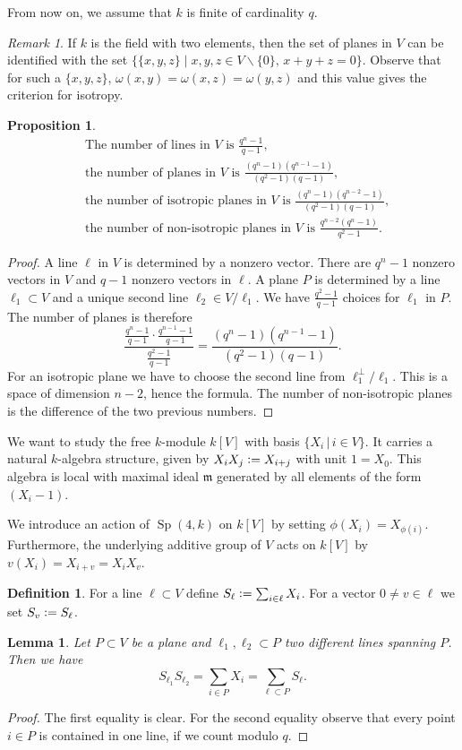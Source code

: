 \documentclass{alggeom}
\DeclareMathOperator{\Sp}{Sp}
\newcommand{\defIs}{\vcentcolon=}
\theoremstyle{plain}
\newtheorem{lemma}[theorem]{Lemma}
\newtheorem{proposition}[theorem]{Proposition}
\theoremstyle{definition}
\newtheorem{definition}[theorem]{Definition}
\theoremstyle{remark}
\newtheorem{remark}[theorem]{Remark}
\begin{document}
From now on, we assume that $k$ is finite of cardinality $q$.
\begin{remark} \label{PlaneTriple}
 If $k$ is the field with two elements, then the set of planes in $V$ can be identified with the set $\{\{x,y,z\}\;|\;x,y,z\in V\backslash\{0\},\,x+y+z=0\}$. Observe that for such a $\{x,y,z\}$, $\omega(x,y)=\omega(x,z)=\omega(y,z)$ and this value gives the criterion for isotropy.
\end{remark}
\begin{proposition}\label{OrbitesSp}
\begin{align}
&\text{The number of lines in $V$ is }\frac{q^n-1}{q-1}, \\
&\text{the number of planes in $V$ is }\frac{(q^n-1)(q^{n-1}-1)}{(q^2-1)(q-1)}, \\
&\text{the number of isotropic planes in $V$ is }\frac{(q^n-1)(q^{n-2}-1)}{(q^2-1)(q-1)}, \\
&\text{the number of non-isotropic planes in $V$ is }\frac{q^{n-2}(q^n-1)}{q^2-1}.
\end{align}
\end{proposition}
\begin{proof}
A line $\ell$ in $V$ is determined by a nonzero vector. There are $q^n - 1$ nonzero vectors in $V$ and $q-1$ nonzero vectors in $\ell$. A plane $P$ is determined by a line $\ell_1 \subset V$ and a unique second line $\ell_2\in V/\ell_1$. We have $\frac{q^2-1}{q-1}$ choices for $\ell_1$ in $P$. The number of planes is therefore
$$
\frac{ \frac{q^n-1}{q-1} \cdot\frac{q^{n-1}-1}{q-1}}{\frac{q^2-1}{q-1} } = \frac{(q^n-1)(q^{n-1}-1)}{(q^2-1)(q-1)}.
$$
For an isotropic plane we have to choose the second line from $\ell_1^\perp/\ell_1$. This is a space of dimension $n-2$, hence the formula. The number of non-isotropic planes is the difference of the two previous numbers.
\end{proof}

We want to study the free $k$-module $k[V]$ with basis $\{X_i \,|\, i\in V\}$. It carries a natural $k$-algebra structure, given by
$X_i X_j \defIs  X_{i+j}$ with unit $1=X_0$. This algebra is local with maximal ideal $\mathfrak m$ generated by all elements of the form $(X_i-1)$.

We introduce an action of $\Sp (4,k)$ on $k[V]$ by setting $\phi(X_i) = X_{\phi(i)}$. Furthermore, the underlying additive group of $V$ acts on $k[V]$ by $v( X_i) = X_{i+v} =X_iX_v$. 
\begin{definition}
For a line $\ell\subset V$ define $S_\ell \defIs  \sum_{i\in\ell} X_i$. For a vector $0\neq v\in \ell$ we set $S_v\defIs S_\ell$.
\end{definition}
\begin{lemma}\label{SympLemma}
Let $P\subset V$ be a plane and $\ell_1,\ell_2\subset P$ two different lines spanning $P$. Then we have
$$
S_{\ell_1}S_{\ell_2}=\sum_{i\in P}X_i = \sum_{\ell\subset P}S_\ell.
$$
\end{lemma}
\begin{proof}
The first equality is clear. For the second equality observe that every point $i\in P$ is contained in one line, if we count modulo $q$.
\end{proof}
\end{document}
